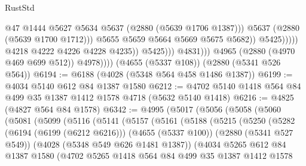 \begin{lexlean}{RustStd}
\begin{coremodule}
                                              @47
                                              @1444
                                              @5627
                                              @5634
                                              @5637
                                              (@2880 (@5639 @1706 @1387)))
                                            @5637
                                            (@2880 (@5639 @1700 @1712)))
                                          @5655
                                          @5659
                                          @5664
                                          @5669
                                          @5675
                                          @5682))
                                      @5425)))))
                            @4218
                            @4222
                            @4226
                            @4228
                            @4235))
                        @5425)))
                  @4831)))
            @4965
            (@2880 (@4970 @469 @699 @512))
            @4978))))
    (@4655 (@5337 @108))
    (@2880 (@5341 @526 @564))
@6194 := @6188 (@4028 (@5348 @564 @458 @1486 @1387))
@6199 := @4034 @5140 @612 @84 @1387 @1580
@6212 := @4702 @5140 @1418 @564 @84 @499 @35 @1387 @1412 @1578 @4718 (@5632 @5140 @1418)
@6216 := @4825 (@4827 @564 @84 @1578)
@6342 := @4995
    (@5017
      (@5056
        (@5058
          (@5060
            (@5081
              (@5099
                (@5116
                  (@5141
                    (@5157
                      (@5161
                        (@5188
                          (@5215
                            (@5250
                              (@5282
                                (@6194 (@6199 (@6212 @6216)))
                                (@4655 (@5337 @100))
                                (@2880 (@5341 @527 @549))
                                (@4028 (@5348 @549 @626 @1481 @1387))
                                (@4034
                                  @5265
                                  @612
                                  @84
                                  @1387
                                  @1580
                                  (@4702
                                    @5265
                                    @1418
                                    @564
                                    @84
                                    @499
                                    @35
                                    @1387
                                    @1412
                                    @1578

\end{coremodule}
\end{lexlean}
